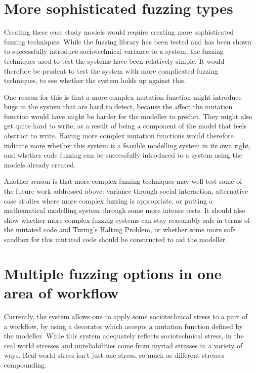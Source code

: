 \section{More sophisticated fuzzing types}
\label{more_advanced_fuzzing}
Creating these case study models would require creating more sophisticated fuzzing techniques. While the fuzzing library has been tested and has been shown to successfully introduce sociotechnical variance to a system, the fuzzing techniques used to test the systems have been relatively simple. It would therefore be prudent to test the system with more complicated fuzzing techniques, to see whether the system holds up against this. \par

One reason for this is that a more complex mutation function might introduce bugs in the system that are hard to detect, because the affect the mutation function would have might be harder for the modeller to predict. They might also get quite hard to write, as a result of being a component of the model that feels abstract to write. Having more complex mutation functions would therefore indicate more whether this system is a feasible modelling system in its own right, and whether code fuzzing can be successfully introduced to a system using the models already created. \par

Another reason is that more complex fuzzing techniques may well test some of the future work addressed above: variance through social interaction, alternative case studies where more complex fuzzing is appropriate, or putting a mathematical modelling system through some more intense tests. It should also show whether more complex fuzzing systems can stay reasonably safe in terms of the mutated code and Turing's Halting Problem\cite{Turing1937}, or whether some more safe sandbox for this mutated code should be constructed to aid the modeller. \par%

\section{Multiple fuzzing options in one area of workflow}
\label{multiple_variances}
Currently, the system allows one to apply some sociotechnical stress to a part of a workflow, by using a decorator which accepts a mutation function defined by the modeller. While this system adequately reflects sociotechnical stress, in the real world stresses and unreliabilities come from myriad stresses in a variety of ways. Real-world stress isn't just one stress, so much as different stresses compounding. \par

